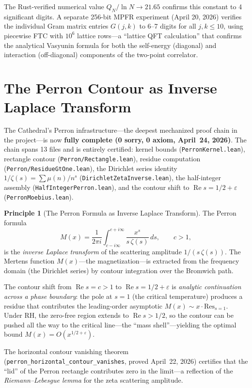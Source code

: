 \documentclass[11pt,a4paper]{article}
\theoremstyle{definition}
\newtheorem{principle}[definition]{Principle}
\newcommand{\re}{\operatorname{Re}}
\newcommand{\lean}[1]{\texttt{#1}}
\begin{document}
The Rust-verified numerical value $Q_N / \ln N \to 21.65$ confirms
this constant to 4 significant digits. A separate 256-bit MPFR
experiment (April 20, 2026) verifies the individual Gram matrix
entries $G(j,k)$ to 6--7 digits for all $j, k \leq 10$, using
piecewise FTC with $10^6$ lattice rows---a ``lattice QFT
calculation'' that confirms the analytical Vasyunin formula
for both the self-energy (diagonal) and interaction (off-diagonal)
components of the two-point correlator.

\section{The Perron Contour as Inverse Laplace Transform}
\label{sec:perron}

The Cathedral's Perron infrastructure---the deepest mechanized proof chain
in the project---is now \textbf{fully complete (0 sorry, 0 axiom, April~24, 2026)}.
The chain spans 13 files and is entirely certified:
kernel bounds (\lean{PerronKernel.lean}), rectangle contour
(\lean{Perron/Rectangle.lean}), residue computation
(\lean{Perron/ResidueGtOne.lean}), the Dirichlet series identity
$1/\zeta(s) = \sum \mu(n)/n^s$ (\lean{DirichletZetaInverse.lean}),
the half-integer assembly (\lean{HalfIntegerPerron.lean}), and the
contour shift to $\re s = 1/2 + \varepsilon$ (\lean{PerronMoebius.lean}).

\begin{principle}[The Perron Formula as Inverse Laplace Transform]
The Perron formula
\[
  M(x) = \frac{1}{2\pi i}
  \int_{c - i\infty}^{c + i\infty}
  \frac{x^s}{s\,\zeta(s)}\,ds,
  \qquad c > 1,
\]
is the \emph{inverse Laplace transform} of the scattering amplitude
$1/(s\,\zeta(s))$. The Mertens function $M(x)$---the magnetization---is
extracted from the frequency domain (the Dirichlet series) by contour
integration over the Bromwich path.

The contour shift from $\re s = c > 1$ to $\re s = 1/2 + \varepsilon$
is \emph{analytic continuation across a phase boundary}: the pole at $s = 1$
(the critical temperature) produces a residue that contributes the
leading-order asymptotic $M(x) \sim x \cdot \mathrm{Res}_{s=1}$. Under RH,
the zero-free region extends to $\re s > 1/2$, so the contour can be
pushed all the way to the critical line---the ``mass shell''---yielding
the optimal bound $M(x) = O(x^{1/2+\varepsilon})$.

The horizontal contour vanishing theorem (\lean{perron\_horizontal\_contour\_vanishes},
proved April~22, 2026) certifies that the ``lid'' of the Perron rectangle
contributes zero in the limit---a reflection of the \emph{Riemann--Lebesgue
lemma} for the zeta scattering amplitude.
\end{principle}
\end{document}
